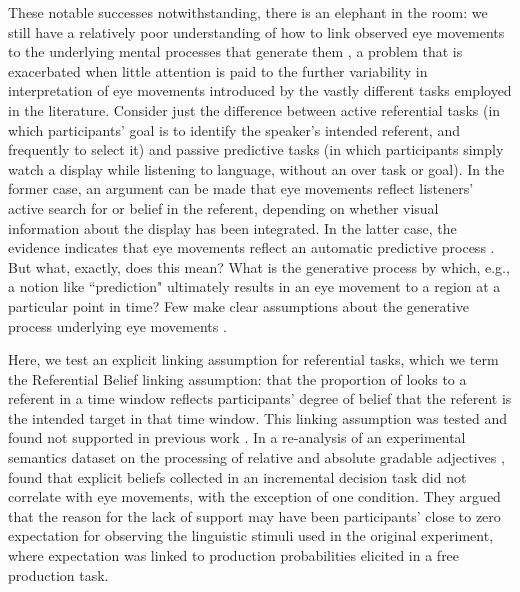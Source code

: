 \documentclass[10pt,letterpaper]{article}
\begin{document}
These notable successes notwithstanding, there is an elephant in the room: we still have a relatively poor understanding of how to link observed eye movements to the underlying mental processes that generate them \cite{SalverdaTanenhaus2017:The-Visual-World-Paradigm, tanenhaus2000eye, Allopenna1998, magnuson2019fixations}, a problem that is exacerbated when little attention is paid to the further variability in interpretation of eye movements introduced by the vastly different tasks employed in the literature. Consider just the difference between active referential tasks (in which participants' goal is to identify the speaker's intended referent, and frequently to select it) and passive predictive tasks (in which participants simply watch a display while listening to language, without an over task or goal). In the former case, an argument can be made that eye movements reflect listeners' active search for or belief in the referent, depending on whether visual information about the display has been integrated. In the latter case, the evidence indicates that eye movements reflect an automatic predictive process \cite{altmann1999}. But what, exactly, does this mean? What is the generative process by which, e.g., a notion like ``prediction" ultimately results in an eye movement to a region at a particular point in time? Few make clear assumptions about the generative process underlying eye movements \cite<but for a principled early example, see >{Allopenna1998}.

Here, we test an explicit linking assumption for referential tasks, which we term the Referential Belief linking assumption: that the proportion of looks to a referent in a time window reflects participants' degree of belief that the referent is the intended target in that time window. This linking assumption was tested and found not supported in previous work \cite{QingLD2018}. In a re-analysis of an experimental semantics dataset on the processing of relative and absolute gradable adjectives \cite{LeffelXiangKennedy2016:Imprecision-is-Pragmatic-},  found that explicit beliefs collected in an incremental decision task \cite<similar to gating tasks,>{Allopenna1998} did not correlate with eye movements, with the exception of one condition. They argued that the reason for the lack of support may have been participants' close to zero expectation for observing the linguistic stimuli used in the original experiment, where expectation was linked to production probabilities elicited in a free production task.
\end{document}
